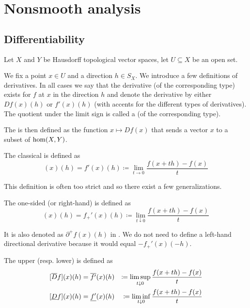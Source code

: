 \section{Nonsmooth analysis}\label{sec:nonsmooth_analysis}
\subsection{Differentiability}\label{subsec:differentiability}

Let \( X \) and \( Y \) be Hausdorff topological vector spaces, let \( U \subseteq X \) be an open set.

\begin{definition}\label{def:derivatives}
  We fix a point \( x \in U \) and a direction \( h \in S_X \). We introduce a few definitions of derivatives. In all cases we say that the derivative (of the corresponding type) exists for \( f \) at \( x \) in the direction \( h \) and denote the derivative by either \( Df(x)(h) \) or \( f'(x)(h) \) (with accents for the different types of derivatives). The quotient under the limit sign is called a  (of the corresponding type).

  The  is then defined as the function \( x \mapsto Df(x) \) that sends a vector \( x \) to a subset of \( \operatorname{hom}(X, Y) \).

  \begin{defenum}
     The classical  is defined as
    \begin{equation*}
      [Df](x)(h) = f'(x)(h) \coloneqq \lim_{t \to 0} \frac {f(x + th) - f(x)} t
    \end{equation*}

    This definition is often too strict and so there exist a few generalizations.

    \cite[lemma 1.2]{Phelps1993} The one-sided (or right-hand)  is defined as
    \begin{equation*}
      [D_+ f](x)(h) = f_+'(x)(h) \coloneqq \lim_{t \downarrow 0} \frac {f(x + th) - f(x)} t
    \end{equation*}

    It is also denoted as \( \partial^+ f(x)(h) \) in \cite[lemma 1.2]{Phelps1993}. We do not need to define a left-hand directional derivative because it would equal \( -f_+'(x)(-h) \).

    \cite[definition 11.18]{Clarke2013} The upper (resp. lower)  is defined as
    \begin{align*}
      &[\overline{D} f](x)(h) = \overline{f'}(x)(h) &\coloneqq \limsup_{t \downarrow 0} \frac {f(x + th) - f(x)} t
      \\
      &[\underline{D} f](x)(h) = \underline{f'}(x)(h) &\coloneqq \liminf_{t \downarrow 0} \frac {f(x + th) - f(x)} t
    \end{align*}


\end{defenum}
\end{definition}
